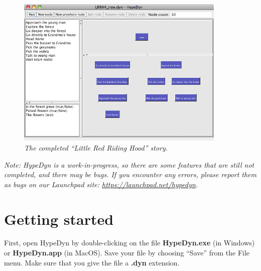 \documentclass{article}
\begin{document}
\begin{figure}[h]
  \centering
  \includegraphics[width=10cm]{images/hypedyn-tutorial-3-figure-1}
  \caption{\textit{The completed ``Little Red Riding Hood'' story.}}
  \label{fig:tut3:completed}
\end{figure} 

\textit{Note:  HypeDyn is a work-in-progress, so there are some features that are still
not completed, and there may be bugs. If you encounter any errors, please
report them as bugs on our Launchpad site: \url{https://launchpad.net/hypedyn}.}

\section{Getting started}


First, open HypeDyn by double-clicking on the file \textbf{HypeDyn.exe} (in
Windows) or \textbf{HypeDyn.app} (in MacOS). Save your file by choosing ``Save''
from the File menu. Make sure that you give the file a \textbf{.dyn} extension.
\end{document}
